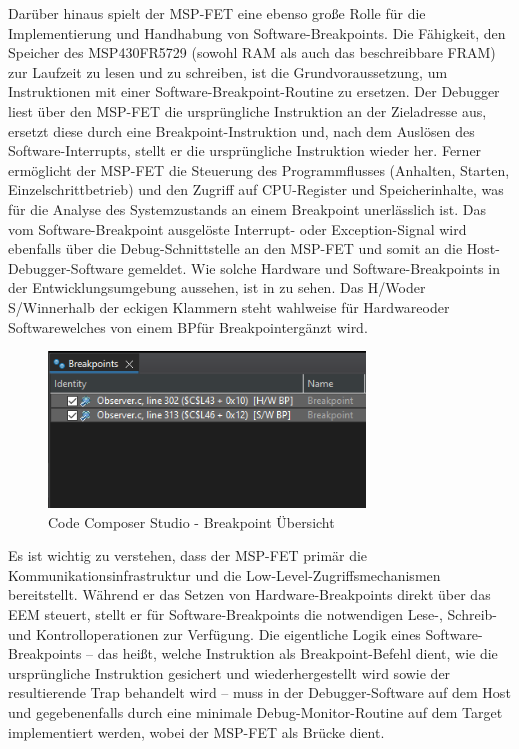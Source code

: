 Dar\"uber hinaus spielt der MSP-FET eine ebenso gro{\ss}e Rolle f\"ur die Implementierung und Handhabung von Software-Breakpoints. Die F\"ahigkeit, den Speicher des MSP430FR5729 (sowohl RAM als auch das beschreibbare FRAM) zur Laufzeit zu lesen und zu schreiben, ist die Grundvoraussetzung, um Instruktionen mit einer Software-Breakpoint-Routine zu ersetzen. Der Debugger liest \"uber den MSP-FET die urspr\"ungliche Instruktion an der Zieladresse aus, ersetzt diese durch eine Breakpoint-Instruktion und, nach dem Ausl\"osen des Software-Interrupts, stellt er die urspr\"ungliche Instruktion wieder her. Ferner erm\"oglicht der MSP-FET die Steuerung des Programmflusses (Anhalten, Starten, Einzelschrittbetrieb) und den Zugriff auf CPU-Register und Speicherinhalte, was f\"ur die Analyse des Systemzustands an einem Breakpoint unerl\"asslich ist. Das vom Software-Breakpoint ausgel\"oste Interrupt- oder Exception-Signal wird ebenfalls \"uber die Debug-Schnittstelle an den MSP-FET und somit an die Host-Debugger-Software gemeldet. Wie solche Hardware und Software-Breakpoints in der Entwicklungsumgebung aussehen, ist in  zu sehen. Das \glqq H/W\grqq oder \glqq S/W\grqq innerhalb der eckigen Klammern steht wahlweise f\"ur \glqq Hardware\grqq oder \glqq Software\grqq welches von einem \glqq BP\grqq f\"ur \glqq Breakpoint\grqq erg\"anzt wird.

\begin{figure}[h!]
	\centering
	\includegraphics[width=0.75\textwidth]{../Bilder/HW_SW_Breakpoint.png}
	\caption{Code Composer Studio - Breakpoint \"Ubersicht}
	\label{fig:CCS_SetBR}
\end{figure}

Es ist wichtig zu verstehen, dass der MSP-FET prim\"ar die Kommunikationsinfrastruktur und die Low-Level-Zugriffsmechanismen bereitstellt. W\"ahrend er das Setzen von Hardware-Breakpoints direkt \"uber das EEM steuert, stellt er f\"ur Software-Breakpoints die notwendigen Lese-, Schreib- und Kontrolloperationen zur Verf\"ugung. Die eigentliche Logik eines Software-Breakpoints – das hei{\ss}t, welche Instruktion als Breakpoint-Befehl dient, wie die urspr\"ungliche Instruktion gesichert und wiederhergestellt wird sowie der resultierende Trap behandelt wird – muss in der Debugger-Software auf dem Host und gegebenenfalls durch eine minimale Debug-Monitor-Routine auf dem Target implementiert werden, wobei der MSP-FET als Br\"ucke dient. 

